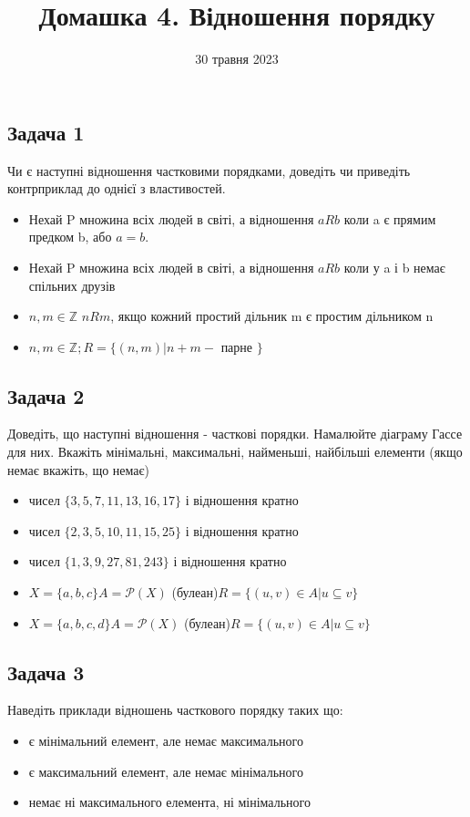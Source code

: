 \documentclass{article}
\begin{document}
\title{Домашка 4. Відношення порядку}
\date{30 травня 2023}

\maketitle

\subsection*{Задача 1}
Чи є наступні відношення частковими порядками, доведіть чи приведіть контрприклад до однієї з властивостей.
\begin{itemize}
    \item Нехай P множина всіх людей в світі, а відношення $aRb$ коли a є прямим предком b, або $a=b$.
    \item Нехай P множина всіх людей в світі, а відношення $aRb$ коли у a і b немає спільних друзів
    \item $n,m \in \mathbb{Z}$ $nRm$, якщо кожний простий дільник m є простим дільником n
    \item $n,m \in \mathbb{Z}; R = \{(n,m)|n+m -$ парне $\}$
\end{itemize}

\subsection*{Задача 2}
Доведіть, що наступні відношення - часткові порядки. Намалюйте діаграму Гассе для них. Вкажіть мінімальні, максимальні, найменьші, найбільші елементи (якщо немає вкажіть, що немає)
\begin{itemize}
    \item чисел $\{3, 5, 7, 11, 13, 16, 17\}$ і відношення кратно
    \item чисел $\{2, 3, 5, 10, 11, 15, 25\}$ і відношення кратно
    \item чисел $\{1, 3, 9, 27, 81, 243\}$ і відношення кратно
    \item $X=\{a,b,c\} A=\mathcal{P}(X)$ (булеан)$  R = \{(u,v) \in A| u \subseteq v\}$
    \item $X=\{a,b,c,d\} A=\mathcal{P}(X)$ (булеан)$  R = \{(u,v) \in A| u \subseteq v\}$
\end{itemize}

\subsection*{Задача 3}
Наведіть приклади відношень часткового порядку таких що:
\begin{itemize}
    \item є мінімальний елемент, але немає максимального
    \item є максимальний елемент, але немає мінімального
    \item немає ні максимального елемента, ні мінімального
\end{itemize}
\end{document}
